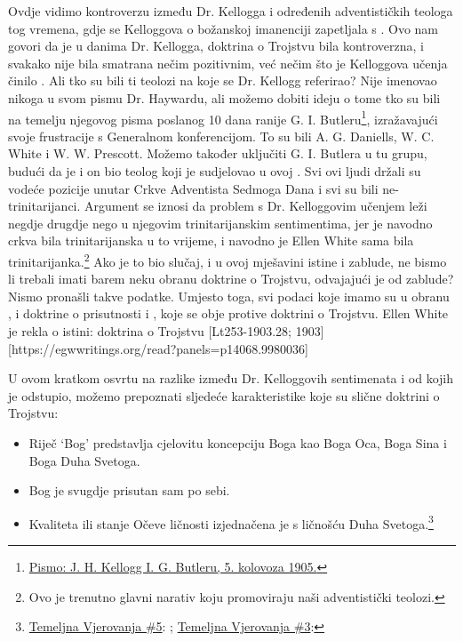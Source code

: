 Ovdje vidimo kontroverzu između Dr. Kellogga i određenih adventističkih teologa tog vremena, gdje se Kelloggova  o božanskoj imanenciji zapetljala s . Ovo nam govori da je u danima Dr. Kellogga, doktrina o Trojstvu bila kontroverzna, i svakako nije bila smatrana nečim pozitivnim, već nečim što je Kelloggova učenja činilo . Ali tko su bili ti teolozi na koje se Dr. Kellogg referirao? Nije imenovao nikoga u svom pismu Dr. Haywardu, ali možemo dobiti ideju o tome tko su bili  na temelju njegovog pisma poslanog 10 dana ranije G. I. Butleru\footnote{\href{https://forgotten-pillar.s3.us-east-2.amazonaws.com/1905-08-05-kellogg-butler.pdf}{Pismo: J. H. Kellogg I. G. Butleru, 5. kolovoza 1905.}}, izražavajući svoje frustracije s Generalnom konferencijom. To su bili A. G. Daniells, W. C. White i W. W. Prescott. Možemo također uključiti G. I. Butlera u tu grupu, budući da je i on bio teolog koji je sudjelovao u ovoj . Svi ovi ljudi držali su vodeće pozicije unutar Crkve Adventista Sedmoga Dana i svi su bili ne-trinitarijanci. Argument se iznosi da problem s Dr. Kelloggovim učenjem leži negdje drugdje nego u njegovim trinitarijanskim sentimentima, jer je navodno crkva bila trinitarijanska u to vrijeme, i navodno je Ellen White sama bila trinitarijanka.\footnote{Ovo je trenutno glavni narativ koju promoviraju naši adventistički teolozi.} Ako je to bio slučaj, i u ovoj mješavini istine i zablude, ne bismo li trebali imati barem neku obranu doktrine o Trojstvu, odvajajući je od zablude? Nismo pronašli takve podatke. Umjesto toga, svi podaci koje imamo su u obranu , i doktrine o prisutnosti i , koje se obje protive doktrini o Trojstvu. Ellen White je rekla o istini: doktrina o Trojstvu [Lt253-1903.28; 1903][https://egwwritings.org/read?panels=p14068.9980036]

U ovom kratkom osvrtu na razlike između Dr. Kelloggovih sentimenata i  od kojih je odstupio, možemo prepoznati sljedeće karakteristike koje su slične doktrini o Trojstvu:

\begin{itemize}
    \item Riječ ‘Bog’ predstavlja cjelovitu koncepciju Boga kao Boga Oca, Boga Sina i Boga Duha Svetoga.
    \item Bog je svugdje prisutan sam po sebi.
    \item Kvaliteta ili stanje Očeve ličnosti izjednačena je s ličnošću Duha Svetoga.\footnote{\href{https://www.adventist.org/wp-content/uploads/2020/06/ADV-28Beliefs2020.pdf}{Temeljna Vjerovanja \#5}: ; \href{https://www.adventist.org/wp-content/uploads/2020/06/ADV-28Beliefs2020.pdf}{Temeljna Vjerovanja \#3}: }
\end{itemize}


